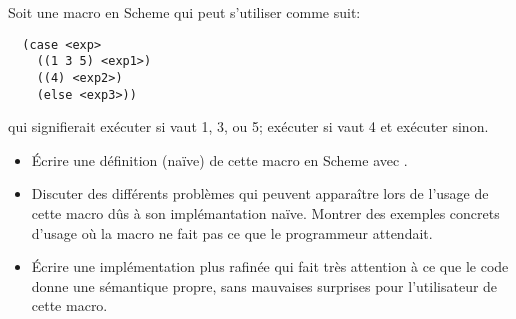\begin{Exercise}[title={Macro case}]
\label{ex:macro_case}
  Soit une macro  en Scheme qui peut s'utiliser comme suit:
\begin{verbatim}
  (case <exp>
    ((1 3 5) <exp1>)
    ((4) <exp2>)
    (else <exp3>))
\end{verbatim}
qui signifierait exécuter  si  vaut 1, 3, ou 5;
exécuter  si  vaut 4 et exécuter  sinon.

\begin{itemize}
\item Écrire une définition (naïve) de cette macro en Scheme avec
  .

\item Discuter des différents problèmes qui peuvent apparaître lors de
  l'usage de cette macro dûs à son implémantation naïve.  Montrer des
  exemples concrets d'usage où la macro ne fait pas ce que le
  programmeur attendait.

\item Écrire une implémentation plus rafinée qui fait très attention à ce
  que le code donne une sémantique propre, sans mauvaises surprises pour
  l'utilisateur de cette macro.
\end{itemize}
\end{Exercise}

\begin{Answer}[ref={ex:macro_case}]
\end{Answer}